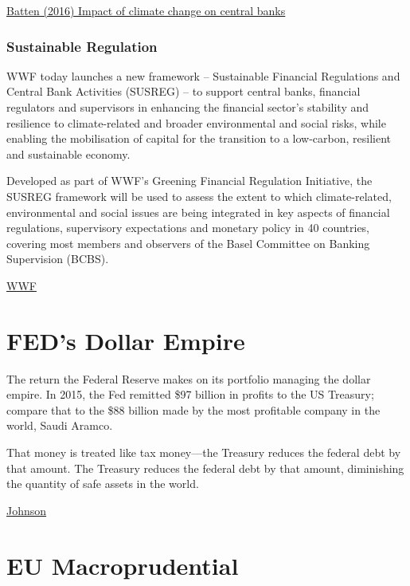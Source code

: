 \documentclass[
]{book}
\begin{document}
\href{https://www.bankofengland.co.uk/working-paper/2016/lets-talk-about-the-weather-the-impact-of-climate-change-on-central-banks}{Batten (2016) Impact of climate change on central banks}

\hypertarget{sustainable-regulation}{%
\subsubsection{Sustainable Regulation}\label{sustainable-regulation}}

WWF today launches a new framework -- Sustainable Financial Regulations and Central Bank Activities (SUSREG) -- to support central banks, financial regulators and supervisors in enhancing the financial sector's stability and resilience to climate-related and broader environmental and social risks, while enabling the mobilisation of capital for the transition to a low-carbon, resilient and sustainable economy.

Developed as part of WWF's Greening Financial Regulation Initiative, the SUSREG framework will be used to assess the extent to which climate-related, environmental and social issues are being integrated in key aspects of financial regulations, supervisory expectations and monetary policy in 40 countries, covering most members and observers of the Basel Committee on Banking Supervision (BCBS).

\href{https://wwf.panda.org/?1834441/Sustainable-Financial-Regulations-SUSREG}{WWF}

\hypertarget{feds-dollar-empire}{%
\section{FED's Dollar Empire}\label{feds-dollar-empire}}

The return the Federal Reserve makes on its portfolio managing the dollar empire. In 2015, the Fed remitted \$97 billion in profits to the US Treasury; compare that to the \$88 billion made by the most profitable company in the world, Saudi Aramco.

That money is treated like tax money---the Treasury reduces the federal debt by that amount.
The Treasury reduces the federal debt by that amount, diminishing the quantity of safe assets in the world.

\href{https://phenomenalworld.org/analysis/reconstruction-finance}{Johnson}

\hypertarget{eu-macroprudential}{%
\section{EU Macroprudential}\label{eu-macroprudential}}
\end{document}
